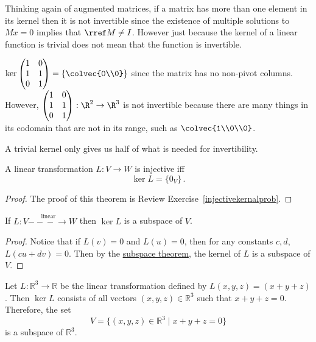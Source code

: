 Thinking again of augmented matrices, 
if a matrix has more than one element in its kernel then it is not invertible since the existence of multiple solutions to $Mx=0$ implies that $\rref M\neq I$. 
However just because the kernel of a linear function is trivial does not mean that the function is invertible. 

\begin{example}
$\ker 
\begin{pmatrix}
1&0\\
1&1\\
0&1
\end{pmatrix} =\left\{  \colvec{0\\0} \right\} $
since the matrix has no non-pivot columns. However, 
$\begin{pmatrix}
1&0\\
1&1\\
0&1
\end{pmatrix}:  \R^2 \to \R^3$
is not invertible because there are many things in its codomain that are not in its range, such as  $\colvec{1\\0\\0}$. 
\end{example}

A trivial kernel only gives us half of what is needed for invertibility.




\begin{theorem}
A linear transformation $L\colon V\rightarrow W$ is injective iff \[\ker L=\{0_V\}\, .\]
\end{theorem}

\begin{proof}
The proof of this theorem is Review Exercise~\ref{injectivekernalprob}.
\end{proof}



\begin{theorem}
If $L \colon V\stackrel{\textrm{linear}}{-\!\!\!-\!\!\!-\!\!\!\rightarrow} W$  then $\ker L$ is a subspace of $V$.
\end{theorem}

\begin{proof}
Notice that if $L(v)=0$ and $L(u)=0$, then for any constants $c,d$, $L(cu+dv)=0$.  Then by the \hyperref[subspacetheorem]{subspace theorem}, the kernel of $L$ is a subspace of $V$.
\end{proof}

\begin{example}
Let \(L \colon \mathbb{R}^3 \to \mathbb{R}\) be the linear transformation defined by \(L(x,y,z)=(x+y+z)\). Then \(\ker L\) consists of all vectors \((x,y,z) \in \mathbb{R}^3\) such that \(x+y+z=0\). Therefore, the set
\[
V=\{(x,y,z) \in \mathbb{R}^3 \mid x+y+z=0\}
\]
is a subspace of \(\mathbb{R}^3\).
\end{example}

